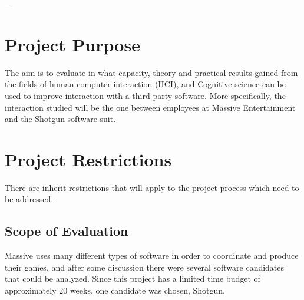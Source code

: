 \documentclass{article}
\begin{document}
\tableofcontents

\begin{center}
---
\end{center}

\section{Project Purpose}

  The aim is to evaluate in what capacity, theory and practical results gained
  from the fields of human-computer interaction\cite{c_hci} (HCI), and Cognitive
  science\cite{c_congnitivescience} can be used to improve interaction with
  a third party software. More specifically, the interaction studied will be the
  one between employees at Massive Entertainment\cite{c_massive} and the
  Shotgun\cite{c_shotgun} software suit.


\section{Project Restrictions}


  There are inherit restrictions that will apply to the project process which
  need to be addressed.

  \subsection{Scope of Evaluation}

    Massive uses many different types of software in order to coordinate and
    produce their games, and after some discussion there were several software
    candidates that could be analyzed. Since this project has a limited time
    budget of approximately 20 weeks, one candidate was chosen, Shotgun. \\
\end{document}
